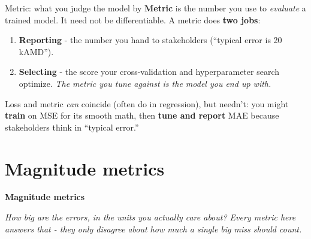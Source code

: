 \documentclass[aspectratio=169]{beamer}
\newcommand{\sectiontransition}[2]{%
  \begin{frame}[plain]
    \centering
    \vfill
    {\color{armblue}\Large\textbf{#1}}\\[14pt]
    \begin{minipage}{0.78\textwidth}\centering\itshape #2\end{minipage}
    \vfill
  \end{frame}%
}
\begin{document}
\begin{frame}{Metric: what you judge the model by}
  \textbf{Metric} is the number you use to \emph{evaluate} a trained model. It need not be differentiable.
  \vfill
  A metric does \textbf{two jobs}:
  \begin{enumerate}
    \item \textbf{Reporting} - the number you hand to stakeholders (``typical error is 20 kAMD'').
    \item \textbf{Selecting} - the score your cross-validation and hyperparameter search optimize. \emph{The metric you tune against is the model you end up with.}
  \end{enumerate}
  \vfill
  Loss and metric \emph{can} coincide (often do in regression), but needn't: you might \textbf{train} on MSE for its smooth math, then \textbf{tune and report} MAE because stakeholders think in ``typical error.''
  \vfill
\end{frame}

\section{Magnitude metrics}
\sectiontransition{Magnitude metrics}{How big are the errors, in the units you actually care about? Every metric here answers that - they only disagree about how much a single big miss should count.}
\end{document}

